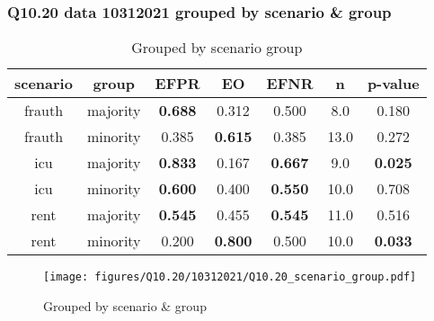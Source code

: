 \subsubsection{Q10.20 data 10312021 grouped by scenario \& group}

\begin{comment}
                        EFPR        EO      EFNR     n    pvalue
(frauth, majority)  0.687500  0.312500  0.500000   8.0  0.179712
(frauth, minority)  0.384615  0.615385  0.384615  13.0  0.272361
(icu, majority)     0.833333  0.166667  0.666667   9.0  0.025401
(icu, minority)     0.600000  0.400000  0.550000  10.0  0.708082
(rent, majority)    0.545455  0.454545  0.545455  11.0  0.516412
(rent, minority)    0.200000  0.800000  0.500000  10.0  0.033006
\end{comment}

\begin{table}[h]
    \centering
    \begin{tabular}{|c|c|c|c|c|c|c|}
        \hline
        scenario & group & EFPR & EO & EFNR & n & p-value\\
        \hline
        frauth & majority & \textbf{0.688} & 0.312 & 0.500 & 8.0 & 0.180\\
		frauth & minority & 0.385 & \textbf{0.615} & 0.385 & 13.0 & 0.272\\
		icu & majority & \textbf{0.833} & 0.167 & \textbf{0.667} & 9.0 & \textbf{0.025}\\
		icu & minority & \textbf{0.600} & 0.400 & \textbf{0.550} & 10.0 & 0.708\\
		rent & majority & \textbf{0.545} & 0.455 & \textbf{0.545} & 11.0 & 0.516\\
		rent & minority & 0.200 & \textbf{0.800} & 0.500 & 10.0 & \textbf{0.033}\\
		
        \hline
    \end{tabular}
    \caption{Grouped by scenario group}
    \label{tab:my_label}
\end{table}
\begin{figure}[h]
    \centering
    \texttt{[image: figures/Q10.20/10312021/Q10.20\_scenario\_group.pdf]}
    \caption{Grouped by scenario \& group}
    \label{fig:my_label}
\end{figure}
